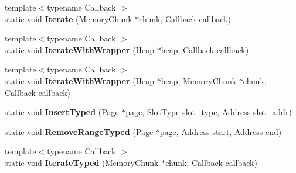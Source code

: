 \begin{DoxyCompactItemize}
\item 
{\footnotesize template$<$typename Callback $>$ }\\static void {\bfseries Iterate} (\hyperlink{classv8_1_1internal_1_1_memory_chunk}{Memory\+Chunk} $\ast$chunk, Callback callback)\hypertarget{classv8_1_1internal_1_1_remembered_set_ad40eef241b347bb0c0d759cbd8d993e3}{}\label{classv8_1_1internal_1_1_remembered_set_ad40eef241b347bb0c0d759cbd8d993e3}

\item 
{\footnotesize template$<$typename Callback $>$ }\\static void {\bfseries Iterate\+With\+Wrapper} (\hyperlink{classv8_1_1internal_1_1_heap}{Heap} $\ast$heap, Callback callback)\hypertarget{classv8_1_1internal_1_1_remembered_set_acc816dea332b6fb8be79d38d6d79f870}{}\label{classv8_1_1internal_1_1_remembered_set_acc816dea332b6fb8be79d38d6d79f870}

\item 
{\footnotesize template$<$typename Callback $>$ }\\static void {\bfseries Iterate\+With\+Wrapper} (\hyperlink{classv8_1_1internal_1_1_heap}{Heap} $\ast$heap, \hyperlink{classv8_1_1internal_1_1_memory_chunk}{Memory\+Chunk} $\ast$chunk, Callback callback)\hypertarget{classv8_1_1internal_1_1_remembered_set_a0c0e3869270f0a766efc32e4157b83ef}{}\label{classv8_1_1internal_1_1_remembered_set_a0c0e3869270f0a766efc32e4157b83ef}

\item 
static void {\bfseries Insert\+Typed} (\hyperlink{classv8_1_1internal_1_1_page}{Page} $\ast$page, Slot\+Type slot\+\_\+type, Address slot\+\_\+addr)\hypertarget{classv8_1_1internal_1_1_remembered_set_a7afde0884ff121543a57270c48d6923c}{}\label{classv8_1_1internal_1_1_remembered_set_a7afde0884ff121543a57270c48d6923c}

\item 
static void {\bfseries Remove\+Range\+Typed} (\hyperlink{classv8_1_1internal_1_1_page}{Page} $\ast$page, Address start, Address end)\hypertarget{classv8_1_1internal_1_1_remembered_set_ad25a0e4589161fc7f55e7088367258d0}{}\label{classv8_1_1internal_1_1_remembered_set_ad25a0e4589161fc7f55e7088367258d0}

\item 
{\footnotesize template$<$typename Callback $>$ }\\static void {\bfseries Iterate\+Typed} (\hyperlink{classv8_1_1internal_1_1_memory_chunk}{Memory\+Chunk} $\ast$chunk, Callback callback)\hypertarget{classv8_1_1internal_1_1_remembered_set_a256db0ea2c35ebf5939c0c9e9c6e8bb3}{}\label{classv8_1_1internal_1_1_remembered_set_a256db0ea2c35ebf5939c0c9e9c6e8bb3}


\end{DoxyCompactItemize}
